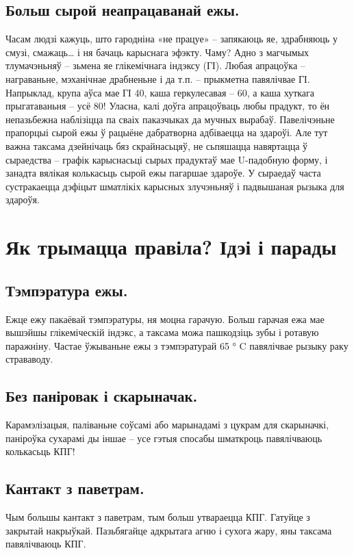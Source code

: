 \subsection{Больш сырой неапрацаванай ежы.}
Часам людзі кажуць, што гародніна «не працуе» – запякаюць яе, здрабняюць у смузі, смажаць… і ня бачаць карыснага эфэкту. Чаму? Адно з магчымых тлумачэньняў – зьмена яе глікемічнага індэксу (ГІ). Любая апрацоўка – награваньне, мэханічнае драбненьне і да т.п. – прыкметна павялічвае ГІ. Напрыклад, крупа аўса мае ГІ 40, каша геркулесавая – 60, а каша хуткага прыгатаваньня – усё 80! Уласна, калі доўга апрацоўваць любы прадукт, то ён непазьбежна наблізіцца па сваіх паказчыках да мучных вырабаў. Павелічэньне прапорцыі сырой ежы ў рацыёне дабратворна адбіваецца на здароўі. Але тут важна таксама дзейнічаць бяз скрайнасьцяў, не сьпяшацца навяртацца ў сыраедства – графік карыснасьці сырых прадуктаў мае U-падобную форму, і занадта вялікая колькасьць сырой ежы пагаршае здароўе. У сыраедаў часта сустракаецца дэфіцыт шматлікіх карысных злучэньняў і падвышаная рызыка для здароўя.

\section{Як трымацца правіла? Ідэі і парады}

\subsection{Тэмпэратура ежы.}
Ежце ежу пакаёвай тэмпэратуры, ня моцна гарачую. Больш гарачая ежа мае вышэйшы глікеміческій індэкс, а таксама можа пашкодзіць зубы і ротавую паражніну. Частае ўжываньне ежы з тэмпэратурай 65 ° C павялічвае рызыку раку страваводу.

\subsection{Без паніровак і скарыначак.}
Карамэлізацыя, паліваньне соўсамі або марынадамі з цукрам для скарыначкі, паніроўка сухарамі ды іншае – усе гэтыя спосабы шматкроць павялічваюць колькасьць КПГ!

\subsection{Кантакт з паветрам.}
Чым большы кантакт з паветрам, тым больш утвараецца КПГ. Гатуйце з закрытай накрыўкай. Пазьбягайце адкрытага агню і сухога жару, яны таксама павялічваюць КПГ.

